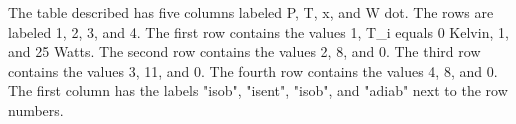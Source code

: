 The table described has five columns labeled P, T, x, and W dot. The rows are labeled 1, 2, 3, and 4. The first row contains the values 1, T_i equals 0 Kelvin, 1, and 25 Watts. The second row contains the values 2, 8, and 0. The third row contains the values 3, 11, and 0. The fourth row contains the values 4, 8, and 0. The first column has the labels "isob", "isent", "isob", and "adiab" next to the row numbers.